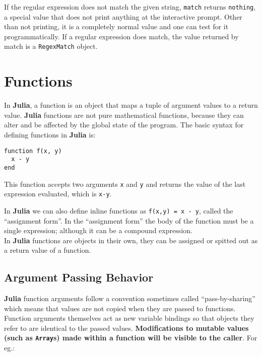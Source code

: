 \documentclass[
]{article}
\begin{document}
If the regular expression does not match the given string,
\texttt{match} returns \texttt{nothing}, a special value that does not
print anything at the interactive prompt. Other than not printing, it is
a completely normal value and one can test for it programmatically. If a
regular expression does match, the value returned by match is a
\texttt{RegexMatch} object.

\newpage

\hypertarget{functions}{%
\section{Functions}\label{functions}}

In \textbf{Julia}, a function is an object that maps a tuple of argument
values to a return value. \textbf{Julia} functions are not pure
mathematical functions, because they can alter and be affected by the
global state of the program. The basic syntax for defining functions in
\textbf{Julia} is:

\begin{verbatim}
function f(x, y)
  x - y
end
\end{verbatim}

This function accepts two arguments \texttt{x} and \texttt{y} and
returns the value of the last expression evaluated, which is
\texttt{x-y}.

In \textbf{Julia} we can also define inline functions as
\texttt{f(x,y)\ =\ x\ -\ y}, called the ``assignment form''. In the
``assignment form'' the body of the function must be a single
expression; although it can be a compound expression.\\
In \textbf{Julia} functions are objects in their own, they can be
assigned or spitted out as a return value of a function.

\hypertarget{argument-passing-behavior}{%
\subsection{Argument Passing Behavior}\label{argument-passing-behavior}}

\textbf{Julia} function arguments follow a convention sometimes called
``pass-by-sharing'' which means that values are not copied when they are
passed to functions. Function arguments themselves act as new variable
bindings so that objects they refer to are identical to the passed
values. \textbf{Modifications to mutable values (such as
\texttt{Array}s) made within a function will be visible to the caller}.
For eg.:
\end{document}
